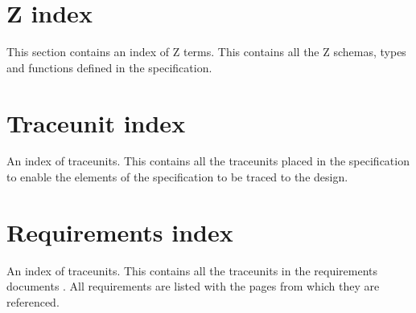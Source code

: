 \documentclass{pxcsdoc}
\begin{document}




\appendix











\chapter{Z index}

This section contains an index of Z terms.
This contains all the Z schemas, types and functions
defined in the specification. 

\begin{multicols}{2}\scriptsize
\begin{theindex}

\end{theindex}
\end{multicols}

\chapter{Traceunit index}

An index of traceunits. This contains all the traceunits placed in the
specification to enable the elements of the specification to be traced to
the design.

\begin{multicols}{2}\scriptsize
\begin{theindex}

\end{theindex}
\end{multicols}

\chapter{Requirements index}

An index of traceunits. This contains all the traceunits in the 
requirements documents . All requirements are listed with the pages
from which they are referenced. 

\begin{multicols}{2}\scriptsize
\begin{theindex}

\end{theindex}
\end{multicols}

\end{document}
